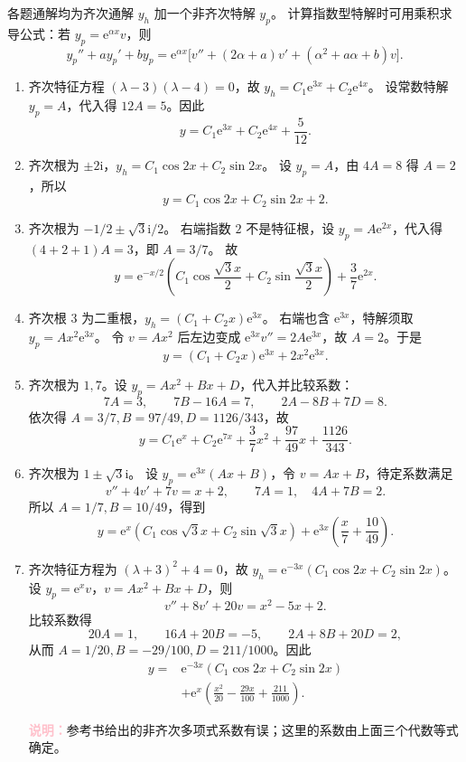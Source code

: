 \documentclass[UTF8,a4paper,11pt]{ctexart}
\newcommand{\e}{\mathrm e}
\newcommand{\note}[1]{\par\smallskip\noindent\textcolor{pink}{\bfseries 说明：}#1\par\smallskip}
\begin{document}
\begin{solution}
各题通解均为齐次通解 $y_h$ 加一个非齐次特解 $y_p$。
计算指数型特解时可用乘积求导公式：若 $y_p=\e^{\alpha x}v$，则
\[
y_p''+ay_p'+by_p
=\e^{\alpha x}\bigl[v''+(2\alpha+a)v'+(\alpha^2+a\alpha+b)v\bigr].
\]
\begin{enumerate}[label=(\arabic*)]
\item 齐次特征方程 $(\lambda-3)(\lambda-4)=0$，故
$y_h=C_1\e^{3x}+C_2\e^{4x}$。
设常数特解 $y_p=A$，代入得 $12A=5$。因此
\[
\boxed{y=C_1\e^{3x}+C_2\e^{4x}+\frac5{12}.}
\]

\item 齐次根为 $\pm2\mathrm i$，$y_h=C_1\cos2x+C_2\sin2x$。
设 $y_p=A$，由 $4A=8$ 得 $A=2$，所以
\[
\boxed{y=C_1\cos2x+C_2\sin2x+2.}
\]

\item 齐次根为 $-1/2\pm\sqrt3\mathrm i/2$。
右端指数 $2$ 不是特征根，设 $y_p=A\e^{2x}$，代入得 $(4+2+1)A=3$，即 $A=3/7$。
故
\[
\boxed{y=\e^{-x/2}\left(C_1\cos\frac{\sqrt3x}{2}+C_2\sin\frac{\sqrt3x}{2}\right)+\frac37\e^{2x}.}
\]

\item 齐次根 $3$ 为二重根，$y_h=(C_1+C_2x)\e^{3x}$。
右端也含 $\e^{3x}$，特解须取 $y_p=Ax^2\e^{3x}$。
令 $v=Ax^2$ 后左边变成 $\e^{3x}v''=2A\e^{3x}$，故 $A=2$。于是
\[
\boxed{y=(C_1+C_2x)\e^{3x}+2x^2\e^{3x}.}
\]

\item 齐次根为 $1,7$。设 $y_p=Ax^2+Bx+D$，代入并比较系数：
\[
7A=3,\qquad 7B-16A=7,\qquad 2A-8B+7D=8.
\]
依次得 $A=3/7,B=97/49,D=1126/343$，故
\[
\boxed{y=C_1\e^x+C_2\e^{7x}+\frac37x^2+\frac{97}{49}x+\frac{1126}{343}.}
\]

\item 齐次根为 $1\pm\sqrt3\mathrm i$。
设 $y_p=\e^{3x}(Ax+B)$，令 $v=Ax+B$，待定系数满足
\[
v''+4v'+7v=x+2,\qquad 7A=1,\quad4A+7B=2.
\]
所以 $A=1/7,B=10/49$，得到
\[
\boxed{y=\e^x(C_1\cos\sqrt3x+C_2\sin\sqrt3x)
+\e^{3x}\left(\frac{x}{7}+\frac{10}{49}\right).}
\]

\item 齐次特征方程为 $(\lambda+3)^2+4=0$，故
$y_h=\e^{-3x}(C_1\cos2x+C_2\sin2x)$。
设 $y_p=\e^xv$，$v=Ax^2+Bx+D$，则
\[
v''+8v'+20v=x^2-5x+2.
\]
比较系数得
\[
20A=1,\qquad16A+20B=-5,\qquad2A+8B+20D=2,
\]
从而 $A=1/20,B=-29/100,D=211/1000$。因此
\[
\boxed{\begin{aligned}
y={}&\e^{-3x}(C_1\cos2x+C_2\sin2x)\\
&+\e^x\left(\frac{x^2}{20}-\frac{29x}{100}+\frac{211}{1000}\right).
\end{aligned}}
\]
\note{参考书给出的非齐次多项式系数有误；这里的系数由上面三个代数等式确定。}


\end{enumerate}
\end{solution}
\end{document}
